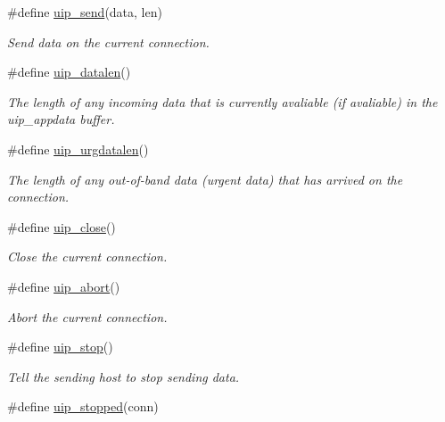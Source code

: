 \begin{CompactItemize}
\item 
\#define \hyperlink{a00064_gb59415b2801e568f52bc1d86ef10e159}{uip\_\-send}(data, len)
\begin{CompactList}\small\item\em Send data on the current connection. \item\end{CompactList}\item 
\#define \hyperlink{a00064_g1a1bc437c09ddef238abab41d77c3177}{uip\_\-datalen}()
\begin{CompactList}\small\item\em The length of any incoming data that is currently avaliable (if avaliable) in the uip\_\-appdata buffer. \item\end{CompactList}\item 
\#define \hyperlink{a00064_g8411c95a4d89367ad2d9d6bde1a3d537}{uip\_\-urgdatalen}()
\begin{CompactList}\small\item\em The length of any out-of-band data (urgent data) that has arrived on the connection. \item\end{CompactList}\item 
\#define \hyperlink{a00064_g61db1dcb7c760e4dd5d60bf4e5576dca}{uip\_\-close}()
\begin{CompactList}\small\item\em Close the current connection. \item\end{CompactList}\item 
\#define \hyperlink{a00064_g88d2ccf7cd821f89d9a8df7e3948b56c}{uip\_\-abort}()
\begin{CompactList}\small\item\em Abort the current connection. \item\end{CompactList}\item 
\#define \hyperlink{a00064_g0a8bb9d6d0f1f56852ccfccbbad6c5d8}{uip\_\-stop}()
\begin{CompactList}\small\item\em Tell the sending host to stop sending data. \item\end{CompactList}\item 
\hypertarget{a00064_g64a238a5c02640a7a4aef004163aeb47}{
\#define \hyperlink{a00064_g64a238a5c02640a7a4aef004163aeb47}{uip\_\-stopped}(conn)}
\label{a00064_g64a238a5c02640a7a4aef004163aeb47}


\end{CompactItemize}
